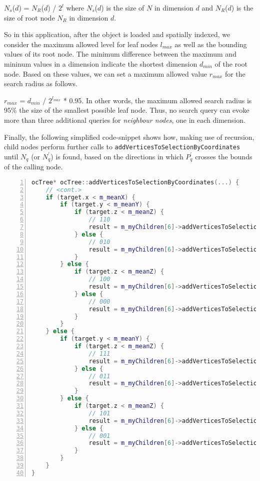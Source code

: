 $N_s$($d$) = $N_{R}$($d$) / $2^{l}$ where $N_s$($d$) is the size of $N$ in dimension $d$ and $N_{R}$($d$) is the size of root node $N_{R}$ in dimension $d$.

So in this application, after the object is loaded and spatially indexed, we consider the maximum allowed level for leaf nodes $l_{max}$ as well as the bounding values of its root node. The minimum difference between the maximum and mininum values in a dimension indicate the shortest dimension $d_{min}$ of the root node. Based on these values, we can set a maximum allowed value $r_{max}$ for the search radius as follows.

$r_{max}$ = $d_{min}$ / $2^{l_{max}}$ * 0.95. In other words, the maximum allowed search radius is 95\% the size of the smallest possible leaf node. Thus, no search query can evoke more than three additional queries for \textit{neighbour nodes}, one in each dimension.

Finally, the following simplified code-snippet shows how, making use of recursion, child nodes perform further calls to \texttt{addVerticesToSelectionByCoordinates} until $N_q$ (or $N_{q}^{'}$) is found, based on the directions in which $P_{q}^{'}$ crosses the bounds of the calling node.

\begin{minipage}{\linewidth}
\begin{lstlisting}[language=C++,numberstyle=\zebra{black!5}{white}{},numbers=left,xleftmargin=2em,tabsize=3]
ocTree* ocTree::addVerticesToSelectionByCoordinates(...) {
	// <cont.>
	if (target.x < m_meanX) {
		if (target.y < m_meanY) {
			if (target.z < m_meanZ) {
				// 110
				result = m_myChildren[6]->addVerticesToSelectionByCoordinates();
			} else {
				// 010
				result = m_myChildren[6]->addVerticesToSelectionByCoordinates();
			}
		} else {
			if (target.z < m_meanZ) {
				// 100
				result = m_myChildren[6]->addVerticesToSelectionByCoordinates();
			} else {
				// 000
				result = m_myChildren[6]->addVerticesToSelectionByCoordinates();
			}
		}
	} else {
		if (target.y < m_meanY) {
			if (target.z < m_meanZ) {
				// 111
				result = m_myChildren[6]->addVerticesToSelectionByCoordinates();
			} else {
				// 011
				result = m_myChildren[6]->addVerticesToSelectionByCoordinates();
			}
		} else {
			if (target.z < m_meanZ) {
				// 101
				result = m_myChildren[6]->addVerticesToSelectionByCoordinates();
			} else {
				// 001
				result = m_myChildren[6]->addVerticesToSelectionByCoordinates();
			}
		}
	}
}
\end{lstlisting}
\end{minipage}


